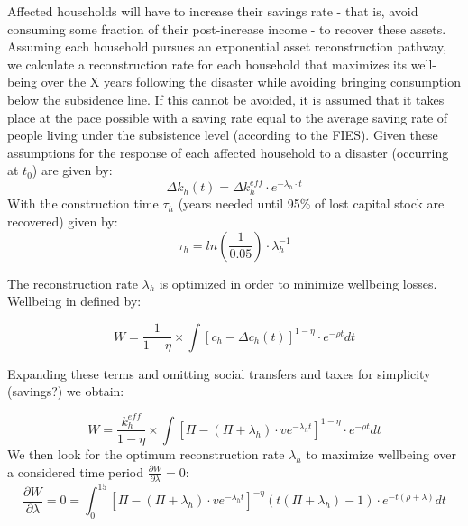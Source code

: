 \documentclass{article}
\begin{document}
Affected households will have to increase their savings rate - that is, avoid consuming some fraction of their post-increase income - to recover these assets. Assuming each household pursues an exponential asset reconstruction pathway, we calculate a reconstruction rate for each household that maximizes its well-being over the X years following the disaster while avoiding bringing consumption below the subsidence line. If this cannot be avoided, it is assumed that it takes place at the pace possible with a saving rate equal to the average saving rate of people living under the subsistence level (according to the FIES). Given these assumptions for the response of each affected household to a disaster (occurring at $t_0$) are given by:
\begin{equation}
\label{eq:kh}
\Delta k_h(t) = \Delta k_h^{eff} \cdot e^{-\lambda_h \cdot t}
\end{equation}
With the construction time $\tau_h$ (years needed until 95\% of lost capital stock are recovered) given by:
\begin{equation}
\label{eq:kh}
\tau_h = ln(\frac{1}{0.05}) \cdot \lambda_h^{-1}
\end{equation}

The reconstruction rate $\lambda_h$ is optimized in order to minimize wellbeing losses. Wellbeing in defined by:

\begin{equation}
\label{eq:kh}
W=\frac{1}{1-\eta} \times  \int [c_h - \Delta c_h(t)]^{1- \eta} \cdot e^{-\rho t}dt
\end{equation}

Expanding these terms and omitting social transfers and taxes for simplicity (savings?) we obtain:

\begin{equation}
\label{eq:kh}
W=\frac{k_h^{eff}}{1-\eta} \times  \int [\Pi - (\Pi+\lambda_h) \cdot ve^{-\lambda_ht}]^{1- \eta} \cdot e^{-\rho t}dt
\end{equation}
We then look for the optimum reconstruction rate $\lambda_h$ to maximize wellbeing over a considered time period $\frac{\partial W}{\partial \lambda} = 0$:
\begin{equation}
\label{eq:kh}
\frac{\partial W}{\partial \lambda} = 0 = \int_{0}^{15} [\Pi - (\Pi+\lambda_h) \cdot ve^{-\lambda_ht}]^{- \eta}(t(\Pi+\lambda_h)-1) \cdot e^{-t(\rho+\lambda)}dt
\end{equation}
\end{document}
